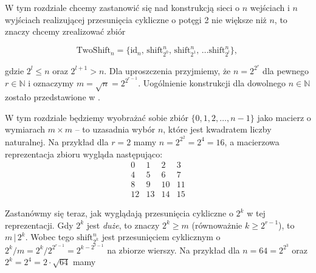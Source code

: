 \documentclass[a4paper]{article}
\newcommand{\shift}[2]{\text{shift}_{#2}^{#1}}
\newcommand{\id}[1]{\text{id}_{#1}}
\newcommand{\tc}{\text{, }}
\newcommand{\twoshift}[1]{\text{TwoShift}_{#1}}
\newcommand{\N}{\mathbb{N}}
\theoremstyle{definition}
\begin{document}
W tym rozdziale chcemy zastanowić się nad konstrukcją sieci o \(n\) wejściach i \(n\) wyjściach realizującej przesunięcia cykliczne o potęgi 2 nie większe niż \(n\), to znaczy chcemy zrealizować zbiór

\[
\twoshift{n} = \{ \id n \tc \shift n {2^0} \tc \shift n {2^1} \tc \ldots \shift n {2^l}\} \tc
\]

gdzie \(2^l \leq n\) oraz \(2^{l+1} > n\). Dla uproszczenia przyjmiemy, że \(n = 2^{2^r}\) dla pewnego \(r \in \N\) i oznaczymy \( m = \sqrt{n} = 2^{2^{r-1}} \). Uogólnienie konstrukcji dla dowolnego \(n \in \N\) zostało przedstawione w \cite{klo}.

\vspace{1em}

W tym rozdziale będziemy wyobrażać sobie zbiór \(\{0, 1, 2, \ldots, n-1\}\) jako macierz o wymiarach \(m \times m\) -- to uzasadnia wybór \(n\), które jest kwadratem liczby naturalnej. Na przykład dla \(r = 2\) mamy \(n = 2^{2^2} = 2^4 = 16\), a macierzowa reprezentacja zbioru wygląda następująco:
\[
\begin{matrix}
 0 &  1 &  2 &  3 \\
 4 &  5 &  6 &  7 \\
 8 &  9 & 10 & 11 \\
12 & 13 & 14 & 15
\end{matrix}
\]

Zastanówmy się teraz, jak wyglądają przesunięcia cykliczne o \(2^k\) w tej reprezentacji. Gdy \(2^k\) jest \textit{duże}, to znaczy \(2^k \geq m\) (równoważnie \(k \geq 2^{r-1}\)), to \(m \, | \, 2^k\). Wobec tego \(\shift n {2^k}\) jest przesunięciem cyklicznym o \(2^k / m = 2^k / 2^{2^{r-1}} = 2^{k - 2^{r-1}}\) na zbiorze wierszy. Na przykład dla \(n = 64 = 2^{2^3}\) oraz \(2^k = 2^4 = 2 \cdot \sqrt{64}\) mamy

\vspace{0.5em}
\end{document}

